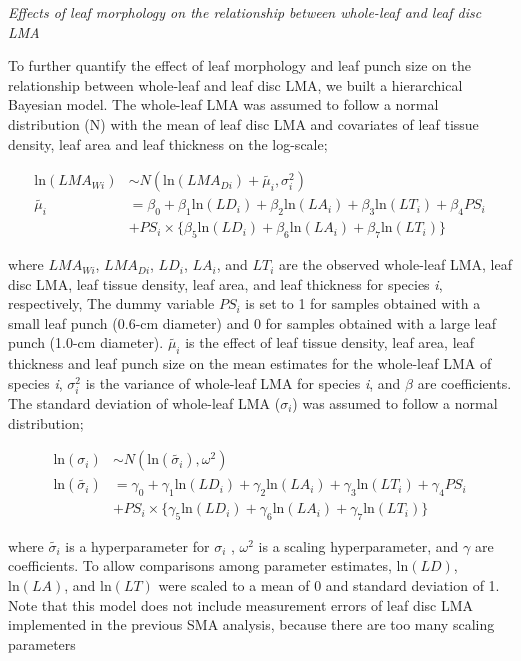 \documentclass[
  12pt,
  a4paper,
,tablecaptionabove
]{scrartcl}
\begin{document}
\emph{Effects of leaf morphology on the relationship between whole-leaf and leaf disc LMA}

To further quantify the effect of leaf morphology and leaf punch size on the relationship between whole-leaf and leaf disc LMA, we built a hierarchical Bayesian model.
The whole-leaf LMA was assumed to follow a normal distribution (N) with the mean of leaf disc LMA and covariates of leaf tissue density, leaf area and leaf thickness on the log-scale;

\begin{align}
\mathrm{ln}(LMA_{Wi}) & \sim N(\mathrm{ln}(LMA_{Di}) + \tilde{\mu_i}, \sigma_i^2) \label{eq:LMA}\\
\tilde{\mu_i} & = \beta_0 + \beta_1 \mathrm{ln}(LD_{i}) + \beta_2 \mathrm{ln}(LA_{i}) + \beta_3 \mathrm{ln}(LT_{i}) + \beta_4 PS_{i} \nonumber \\
& + PS_{i} \times \bigl\{ \beta_5 \mathrm{ln}(LD_{i}) + \beta_6 \mathrm{ln}(LA_{i}) + \beta_7 \mathrm{ln}(LT_{i})\bigr\}\label{eq:mu}
\end{align}

where \(LMA_{Wi}\), \(LMA_{Di}\), \(LD_{i}\), \(LA_{i}\), and \(LT_{i}\) are the observed whole-leaf LMA, leaf disc LMA, leaf tissue density, leaf area, and leaf thickness for species \emph{i}, respectively,
The dummy variable \(PS_i\) is set to 1 for samples obtained with a small leaf punch (0.6-cm diameter) and 0 for samples obtained with a large leaf punch (1.0-cm diameter).
\(\tilde{\mu_i}\) is the effect of leaf tissue density, leaf area, leaf thickness and leaf punch size on the mean estimates for the whole-leaf LMA of species \emph{i}, \(\sigma_i^2\) is the variance of whole-leaf LMA for species \emph{i}, and \(\beta\) are coefficients.
The standard deviation of whole-leaf LMA (\(\sigma_i\)) was assumed to follow a normal distribution;

\begin{align}
\mathrm{ln}(\sigma_i) & \sim N(\mathrm{ln}(\tilde{\sigma_i}), \omega^2) \label{eq:ln-sigma} \\
\mathrm{ln}(\tilde{\sigma_i}) & = \gamma_0 + \gamma_1 \mathrm{ln}(LD_{i}) + \gamma_2 \mathrm{ln}(LA_{i}) + \gamma_3 \mathrm{ln}(LT_{i}) + \gamma_4 PS_{i} \nonumber \\
& + PS_{i} \times \bigl\{\gamma_5 \mathrm{ln}(LD_{i}) + \gamma_6 \mathrm{ln}(LA_{i}) + \gamma_7 \mathrm{ln}(LT_{i})\bigr\}\label{eq:tilde-sigma}
\end{align}

where \(\tilde{\sigma_i}\) is a hyperparameter for \(\sigma_i\) ,
\(\omega^2\) is a scaling hyperparameter, and \(\gamma\) are coefficients.
To allow comparisons among parameter estimates, \(\mathrm{ln}(LD)\), \(\mathrm{ln}(LA)\), and \(\mathrm{ln}(LT)\) were scaled to a mean of 0 and standard deviation of 1.
Note that this model does not include measurement errors of leaf disc LMA implemented in the previous SMA analysis, because there are too many scaling parameters
\end{document}
